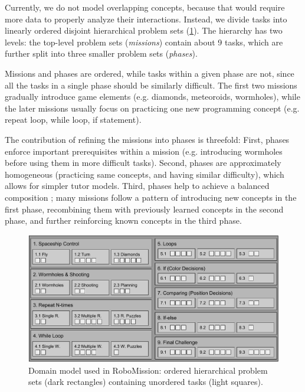 Currently, we do not model overlapping concepts, because that would require
more data to properly analyze their interactions.
Instead, we divide tasks into linearly ordered disjoint hierarchical problem
sets (\cref{fig:robomission.domain}). %
The hierarchy has two levels: the top-level problem sets (\emph{missions})
contain about 9 tasks, which are further split into three smaller
problem sets (\emph{phases}).

Missions and phases are ordered, while tasks within a given phase are not,
since all the tasks in a single phase should be similarly difficult.
The first two missions gradually introduce game elements
(e.g. diamonds, meteoroids, wormholes),
while the later missions usually focus on practicing one new programming
concept (e.g. repeat loop, while loop, if statement).

The contribution of refining the missions into phases is threefold:
First, phases enforce important prerequisites within a mission (e.g.
introducing wormholes before using them in more difficult tasks).
Second, phases are approximately homogeneous (practicing same concepts, and having similar difficulty),
which allows for simpler tutor models.
Third, phases help to achieve a balanced composition \cite{progression-analysis};
  many missions follow a pattern of
  introducing new concepts in the first phase,
  recombining them with previously learned concepts in the second phase,
  and further reinforcing known concepts in the third phase. %

\begin{figure}[htb]
\centering
\includegraphics[width=\textwidth]{img/robomission-domain}
\caption{%
  Domain model used in RoboMission: ordered hierarchical problem sets (dark rectangles)
  containing unordered tasks (light squares).}
\label{fig:robomission.domain}
\end{figure}




